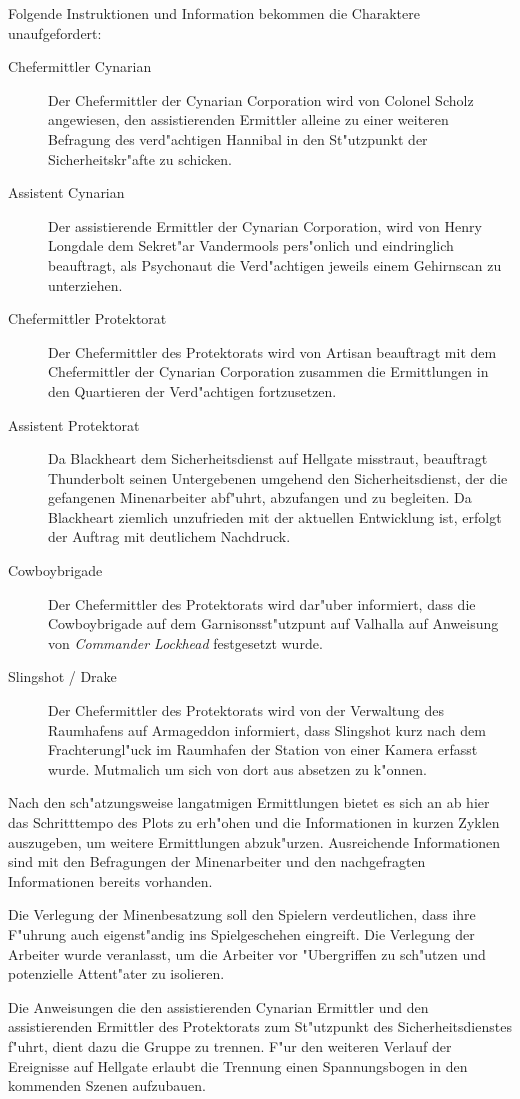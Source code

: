 Folgende Instruktionen und Information bekommen die Charaktere unaufgefordert:

\begin{description}
	\item[Chefermittler Cynarian] Der Chefermittler der Cynarian Corporation wird von Colonel Scholz angewiesen, den assistierenden 
		Ermittler alleine zu einer weiteren Befragung des verd"achtigen Hannibal in den St"utzpunkt der Sicherheitskr"afte zu schicken.
	\item[Assistent Cynarian] Der assistierende Ermittler der Cynarian Corporation, wird von Henry Longdale dem Sekret"ar Vandermools 	
		pers"onlich und eindringlich beauftragt, als Psychonaut die Verd"achtigen jeweils einem Gehirnscan zu unterziehen.
	\item[Chefermittler Protektorat] Der Chefermittler des Protektorats wird von Artisan beauftragt mit dem Chefermittler der Cynarian 
		Corporation zusammen die Ermittlungen in den Quartieren der Verd"achtigen fortzusetzen.
	\item[Assistent Protektorat] Da Blackheart dem Sicherheitsdienst auf Hellgate misstraut, beauftragt Thunderbolt seinen Untergebenen 
		umgehend den Sicherheitsdienst, der die gefangenen Minenarbeiter abf"uhrt, abzufangen und zu begleiten. Da Blackheart ziemlich unzufrieden mit der aktuellen Entwicklung ist, erfolgt der Auftrag mit deutlichem Nachdruck.	
	\item[Cowboybrigade] Der Chefermittler des Protektorats wird dar"uber informiert, dass die Cowboybrigade auf dem Garnisonsst"utzpunt auf 
		Valhalla auf Anweisung von \emph{Commander Lockhead} festgesetzt wurde.
	\item[Slingshot / Drake] Der Chefermittler des Protektorats wird von der Verwaltung des Raumhafens auf Armageddon informiert, dass 
		Slingshot kurz nach dem Frachterungl"uck im Raumhafen der Station von einer Kamera erfasst wurde. Mutma\3lich um sich von dort aus absetzen zu k"onnen.
\end{description}

\begin{remarks}
	Nach den sch"atzungsweise langatmigen Ermittlungen bietet es sich an ab hier das Schritttempo des Plots zu erh"ohen und die Informationen in kurzen Zyklen auszugeben, um weitere Ermittlungen abzuk"urzen. Ausreichende Informationen sind mit den Befragungen der Minenarbeiter und den nachgefragten Informationen bereits vorhanden.

	Die Verlegung der Minenbesatzung soll den Spielern verdeutlichen, dass ihre F"uhrung auch eigenst"andig ins Spielgeschehen eingreift. Die Verlegung der Arbeiter wurde veranlasst, um die Arbeiter vor "Ubergriffen zu sch"utzen und potenzielle Attent"ater zu isolieren.

	Die Anweisungen die den assistierenden Cynarian Ermittler und den assistierenden Ermittler des Protektorats zum St"utzpunkt des Sicherheitsdienstes f"uhrt, dient dazu die Gruppe zu trennen. F"ur den weiteren Verlauf der Ereignisse auf Hellgate erlaubt die Trennung einen Spannungsbogen in den kommenden Szenen aufzubauen.
\end{remarks}

